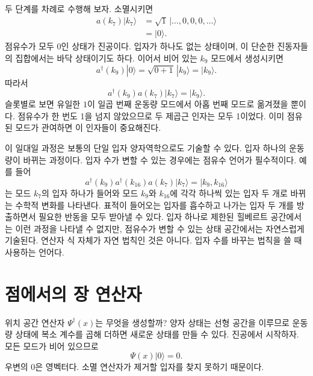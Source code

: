 \begin{classroomqa}\end{classroomqa}

두 단계를 차례로 수행해 보자. 소멸시키면
\begin{align}
a(k_7)|k_7\rangle
&=
\sqrt{1}\,|\ldots,0,0,0,\ldots\rangle\\
&=|0\rangle.
\end{align}
점유수가 모두 0인 상태가 진공이다. 입자가 하나도 없는 상태이며, 이 단순한 진동자들의 집합에서는 바닥 상태이기도 하다. 이어서 비어 있는 \(k_9\) 모드에서 생성시키면
\begin{equation}
a^\dagger(k_9)|0\rangle
=\sqrt{0+1}\,|k_9\rangle
=|k_9\rangle.
\end{equation}
따라서
\begin{equation}
a^\dagger(k_9)a(k_7)|k_7\rangle=|k_9\rangle.
\end{equation}
슬롯별로 보면 유일한 \(1\)이 일곱 번째 운동량 모드에서 아홉 번째 모드로 옮겨졌을 뿐이다. 점유수가 한 번도 1을 넘지 않았으므로 두 제곱근 인자는 모두 1이었다. 이미 점유된 모드가 관여하면 이 인자들이 중요해진다.

이 일대일 과정은 보통의 단일 입자 양자역학으로도 기술할 수 있다. 입자 하나의 운동량이 바뀌는 과정이다. 입자 수가 변할 수 있는 경우에는 점유수 언어가 필수적이다. 예를 들어
\begin{equation}
a^\dagger(k_9)a^\dagger(k_{16})a(k_7)|k_7\rangle
=|k_9,k_{16}\rangle
\end{equation}
는 모드 \(k_7\)의 입자 하나가 들어와 모드 \(k_9\)와 \(k_{16}\)에 각각 하나씩 있는 입자 두 개로 바뀌는 수학적 변화를 나타낸다. 표적이 들어오는 입자를 흡수하고 나가는 입자 두 개를 방출하면서 필요한 반동을 모두 받아낼 수 있다. 입자 하나로 제한된 힐베르트 공간에서는 이런 과정을 나타낼 수 없지만, 점유수가 변할 수 있는 상태 공간에서는 자연스럽게 기술된다. 연산자 식 자체가 자연 법칙인 것은 아니다. 입자 수를 바꾸는 법칙을 쓸 때 사용하는 언어다.

\section{점에서의 장 연산자}

위치 공간 연산자 \(\Psi^\dagger(x)\)는 무엇을 생성할까? 양자 상태는 선형 공간을 이루므로 운동량 상태에 복소 계수를 곱해 더하면 새로운 상태를 만들 수 있다. 진공에서 시작하자. 모든 모드가 비어 있으므로
\begin{equation}
\Psi(x)|0\rangle=0.
\end{equation}
우변의 0은 영벡터다. 소멸 연산자가 제거할 입자를 찾지 못하기 때문이다.

